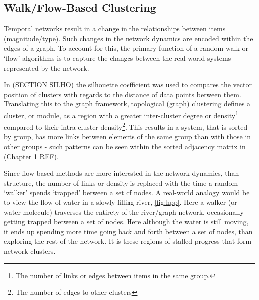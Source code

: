 \subsection{Walk/Flow-Based Clustering}
Temporal networks result in a change in the relationships between items (magnitude/type). Such changes in the network dynamics are encoded within the edges of a graph. To account for this, the primary function of a random walk or `flow' algorithms is to capture the changes between the real-world systems represented by the network.

In (SECTION SILHO) the silhouette coefficient was used to compares the vector position of clusters with regards to the distance of data points between them. Translating this to the graph framework, topological (graph) clustering defines a cluster, or module, as a region with a greater inter-cluster degree or density\footnote{The number of links or edges between items in the same group.} compared to their intra-cluster density\footnote{The number of edges to other clusters}. This results in a system, that is sorted by group, has more links between elements of the same group than with those in other groups - such patterns can be seen within the sorted adjacency matrix in (Chapter 1 REF).

Since flow-based methods are more interested in the network dynamics, than structure, the number of links or density is replaced with the time a random `walker' spends `trapped' between a set of nodes. A real-world analogy would be to view the flow of water in a slowly filling river, \autoref{fig:hpp}. Here a walker (or water molecule) traverses the entirety of the river/graph network, occasionally getting trapped between a set of nodes. Here although the water is still moving, it ends up spending more time going back and forth between a set of nodes, than exploring the rest of the network. It is these regions of stalled progress that form network clusters.

